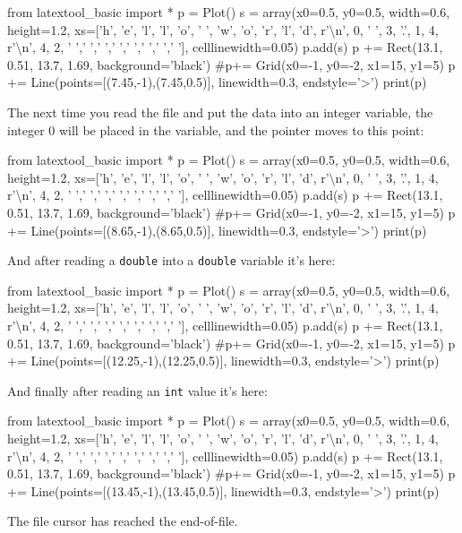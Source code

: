 \begin{python}
from latextool_basic import *
p = Plot()
s = array(x0=0.5, y0=0.5, width=0.6, height=1.2, xs=['h', 'e', 'l', 'l', 'o', ' ', 'w', 'o', 'r', 'l', 'd', r'\textbackslash n', 0, ' ', 3, '.', 1, 4, r'\textbackslash  n', 4, 2, ' ',' ',' ',' ',' ',' ',' ',' '], celllinewidth=0.05)
p.add(s)
p += Rect(13.1, 0.51, 13.7, 1.69, background='black')
#p+= Grid(x0=-1, y0=-2, x1=15, y1=5)
p += Line(points=[(7.45,-1),(7.45,0.5)], linewidth=0.3, endstyle='>')
print(p)
\end{python}
The next time you read the file and put the data into an integer variable, the integer 0 will be placed in the variable, and the pointer moves to this point:

\begin{python}
from latextool_basic import *
p = Plot()
s = array(x0=0.5, y0=0.5, width=0.6, height=1.2, xs=['h', 'e', 'l', 'l', 'o', ' ', 'w', 'o', 'r', 'l', 'd', r'\textbackslash n', 0, ' ', 3, '.', 1, 4, r'\textbackslash  n', 4, 2, ' ',' ',' ',' ',' ',' ',' ',' '], celllinewidth=0.05)
p.add(s)
p += Rect(13.1, 0.51, 13.7, 1.69, background='black')
#p+= Grid(x0=-1, y0=-2, x1=15, y1=5)
p += Line(points=[(8.65,-1),(8.65,0.5)], linewidth=0.3, endstyle='>')
print(p)
\end{python}

And after reading a \texttt{double} into a \texttt{double} variable
it's here:

\begin{python}
from latextool_basic import *
p = Plot()
s = array(x0=0.5, y0=0.5, width=0.6, height=1.2, xs=['h', 'e', 'l', 'l', 'o', ' ', 'w', 'o', 'r', 'l', 'd', r'\textbackslash n', 0, ' ', 3, '.', 1, 4, r'\textbackslash  n', 4, 2, ' ',' ',' ',' ',' ',' ',' ',' '], celllinewidth=0.05)
p.add(s)
p += Rect(13.1, 0.51, 13.7, 1.69, background='black')
#p+= Grid(x0=-1, y0=-2, x1=15, y1=5)
p += Line(points=[(12.25,-1),(12.25,0.5)], linewidth=0.3, endstyle='>')
print(p)
\end{python}
And finally after reading an \texttt{int} value it's here:

\begin{python}
from latextool_basic import *
p = Plot()
s = array(x0=0.5, y0=0.5, width=0.6, height=1.2, xs=['h', 'e', 'l', 'l', 'o', ' ', 'w', 'o', 'r', 'l', 'd', r'\textbackslash n', 0, ' ', 3, '.', 1, 4, r'\textbackslash  n', 4, 2, ' ',' ',' ',' ',' ',' ',' ',' '], celllinewidth=0.05)
p.add(s)
p += Rect(13.1, 0.51, 13.7, 1.69, background='black')
#p+= Grid(x0=-1, y0=-2, x1=15, y1=5)
p += Line(points=[(13.45,-1),(13.45,0.5)], linewidth=0.3, endstyle='>')
print(p)
\end{python}

The file cursor has reached the end-of-file.

